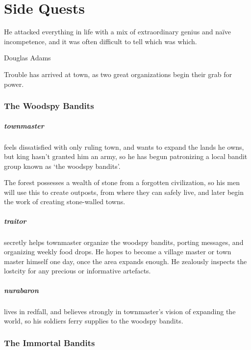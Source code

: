 \chapter{Side Quests}
  \epigraph{He attacked everything in life with a mix of extraordinary genius and na\"ive incompetence, and it was often difficult to tell which was which.}{Douglas Adams}
\label{sideQuestIntro}

\begin{multicols}{2}

\noindent
Trouble has arrived at \gls{town}, as two great organizations begin their grab for power.

\subsection{The Woodspy Bandits}

\paragraph{\gls{townmaster}} feels dissatisfied with only ruling \gls{town}, and wants to expand the lands he owns, but \gls{king} hasn't granted him an army, so he has begun patronizing a local bandit group known as `the woodspy bandits'.

The forest possesses a wealth of stone from a forgotten civilization, so his men will use this to create outposts, from where they can safely live, and later begin the work of creating stone-walled towns.

\paragraph{\gls{traitor}}
secretly helps \gls{townmaster} organize the woodspy bandits, porting messages, and organizing weekly food drops.
He hopes to become a village master or town master himself one day, once the area expands enough.
He zealously inspects the \gls{lostcity} for any precious or informative artefacts.

\paragraph{\Gls{nurabaron}}
lives in \gls{redfall}, and believes strongly in \gls{townmaster}'s vision of expanding the world, so his soldiers ferry supplies to the woodspy bandits.

\subsection{The Immortal Bandits}


\end{multicols}
